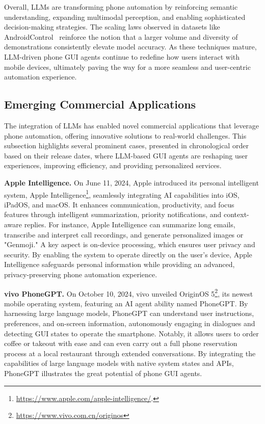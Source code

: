 Overall, LLMs are transforming phone automation by reinforcing semantic understanding, expanding multimodal perception, and enabling sophisticated decision-making strategies. The scaling laws observed in datasets like AndroidControl~\cite{li2024androidcontrol} reinforce the notion that a larger volume and diversity of demonstrations consistently elevate model accuracy. As these techniques mature, LLM-driven phone GUI agents continue to redefine how users interact with mobile devices, ultimately paving the way for a more seamless and user-centric automation experience.


\subsection{Emerging Commercial Applications}

The integration of LLMs has enabled novel commercial applications that leverage phone automation, offering innovative solutions to real-world challenges. This subsection highlights several prominent cases, presented in chronological order based on their release dates, where LLM-based GUI agents are reshaping user experiences, improving efficiency, and providing personalized services.


\noindent\textbf{Apple Intelligence.}
On June 11, 2024, Apple introduced its personal intelligent system, Apple Intelligence\footnote{\href{https://www.apple.com/apple-intelligence/}{https://www.apple.com/apple-intelligence/}.}, seamlessly integrating AI capabilities into iOS, iPadOS, and macOS. It enhances communication, productivity, and focus features through intelligent summarization, priority notifications, and context-aware replies. For instance, Apple Intelligence can summarize long emails, transcribe and interpret call recordings, and generate personalized images or "Genmoji." A key aspect is on-device processing, which ensures user privacy and security. By enabling the system to operate directly on the user's device, Apple Intelligence safeguards personal information while providing an advanced, privacy-preserving phone automation experience.


\noindent\textbf{vivo PhoneGPT.}
On October 10, 2024, vivo unveiled OriginOS 5\footnote{\href{https://www.vivo.com.cn/originos}{https://www.vivo.com.cn/originos}}, its newest mobile operating system, featuring an AI agent ability named PhoneGPT. By harnessing large language models, PhoneGPT can understand user instructions, preferences, and on-screen information, autonomously engaging in dialogues and detecting GUI states to operate the smartphone. Notably, it allows users to order coffee or takeout with ease and can even carry out a full phone reservation process at a local restaurant through extended conversations. By integrating the capabilities of large language models with native system states and APIs, PhoneGPT illustrates the great potential of phone GUI agents.


